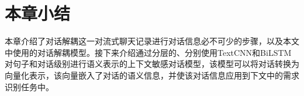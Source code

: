 






\section{本章小结}

本章介绍了对话解耦这一对流式聊天记录进行对话信息必不可少的步骤，以及本文中使用的对话解耦模型。接下来介绍通过分层的、分别使用TextCNN和BiLSTM对句子和对话级别进行语义表示的上下文敏感对话模型，该模型可以将对话转换为向量化表示，该向量嵌入了对话的语义信息，并使该对话信息应用到下文中的需求识别任务中。
